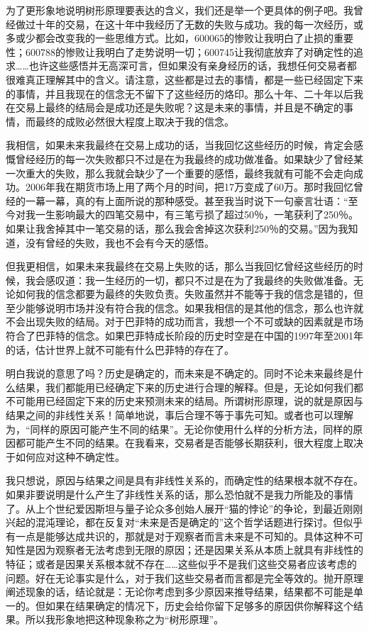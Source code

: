 为了更形象地说明树形原理要表达的含义，我们还是举一个更具体的例子吧。我曾经做过十年的交易，在这十年中我经历了无数的失败与成功。我的每一次经历，或多或少都会改变我的一些思维方式。比如，600065的惨败让我明白了止损的重要性；600788的惨败让我明白了走势说明一切；600745让我彻底放弃了对确定性的追求……也许这些感悟并无高深可言，但如果没有亲身经历的话，我想任何交易者都很难真正理解其中的含义。请注意，这些都是过去的事情，都是一些已经固定下来的事情，并且我现在的信念无不留下了这些经历的烙印。那么十年、二十年以后我在交易上最终的结局会是成功还是失败呢？这是未来的事情，并且是不确定的事情，而最终的成败必然很大程度上取决于我的信念。

我相信，如果未来我最终在交易上成功的话，当我回忆这些经历的时候，肯定会感慨曾经经历的每一次失败都只不过是在为我最终的成功做准备。如果缺少了曾经某一次重大的失败，那么我就会缺少了一个重要的感悟，最终我就有可能不会走向成功。2006年我在期货市场上用了两个月的时间，把17万变成了60万。那时我回忆曾经的一幕一幕，真的有上面所说的那种感受。甚至我当时说下一句豪言壮语：“至今对我一生影响最大的四笔交易中，有三笔亏损了超过50％，一笔获利了250％。如果让我舍掉其中一笔交易的话，那么我会舍掉这次获利250％的交易。”因为我知道，没有曾经的失败，我也不会有今天的感悟。

但我更相信，如果未来我最终在交易上失败的话，那么当我回忆曾经这些经历的时候，我会感叹道：我一生经历的一切，都只不过是在为了我最终的失败做准备。无论如何我的信念都要为最终的失败负责。失败虽然并不能等于我的信念是错的，但至少能够说明市场并没有符合我的信念。如果我相信的是其他的信念，那么也许就不会出现失败的结局。对于巴菲特的成功而言，我想一个不可或缺的因素就是市场符合了巴菲特的信念。如果巴菲特成长阶段的历史时空是在中国的1997年至2001年的话，估计世界上就不可能有什么巴菲特的存在了。

明白我说的意思了吗？历史是确定的，而未来是不确定的。同时不论未来最终是什么结果，我们都能用已经确定下来的历史进行合理的解释。但是，无论如何我们都不可能用已经固定下来的历史来预测未来的结局。所谓树形原理，说的就是原因与结果之间的非线性关系！简单地说，事后合理不等于事先可知。或者也可以理解为，“同样的原因可能产生不同的结果”。无论你使用什么样的分析方法，同样的原因都可能产生不同的结果。在我看来，交易者是否能够长期获利，很大程度上取决于如何应对这种不确定性。

我只想说，原因与结果之间是具有非线性关系的，而确定性的结果根本就不存在。如果非要说明是什么产生了非线性关系的话，那么恐怕就不是我力所能及的事情了。从上个世纪爱因斯坦与量子论众多创始人展开“猫的悖论”的争论，到最近刚刚兴起的混沌理论，都在反复对“未来是否是确定的”这个哲学话题进行探讨。但似乎有一点是能够达成共识的，那就是对于观察者而言未来是不可知的。具体这种不可知性是因为观察者无法考虑到无限的原因；还是因果关系从本质上就具有非线性的特征；或者是因果关系根本就不存在……这些似乎不是我们这些交易者应该考虑的问题。好在无论事实是什么，对于我们这些交易者而言都是完全等效的。抛开原理阐述现象的话，结论就是：无论你考虑到多少原因来推导结果，结果都不可能是单一的。但如果在结果确定的情况下，历史会给你留下足够多的原因供你解释这个结果。所以我形象地把这种现象称之为“树形原理”。

